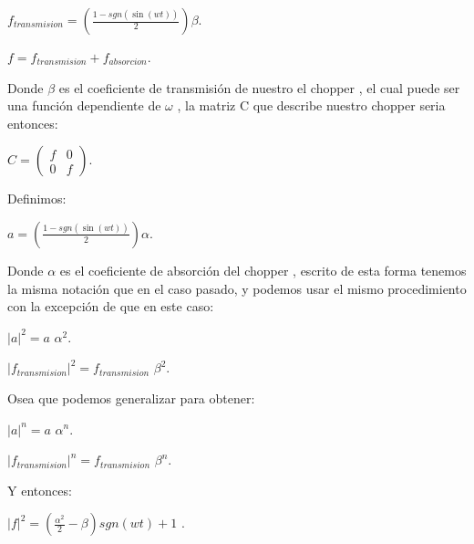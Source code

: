 \documentclass[11pt]{article}
\begin{document}
$f_{transmision}=\left(\frac{1-sgn(\sin(wt))}{2} \right)\beta$.

$f=f_{transmision}+f_{absorcion}$.

\vspace{0.4cm}

Donde $\beta$
 es el coeficiente de transmisión de nuestro el chopper
, el cual puede ser una función dependiente de $\omega$
, la matriz C que describe nuestro chopper
 seria entonces:
 
\vspace{0.4cm}

$C
=\begin
{pmatrix} f & 0 \\ 0 & f \end
{pmatrix}$.

Definimos:

$a=\left(\frac{1-sgn(\sin(wt))}{2}\right) \alpha$.

Donde $\alpha
 $ es el coeficiente de absorción del chopper
, escrito de esta forma tenemos la misma notación que en el caso pasado, y podemos usar el mismo procedimiento con la excepción de que en este caso:

$|a|^2=a$ $\alpha^2$.

$|f_{transmision}|^2=f_{transmision}$ $\beta^2$.

Osea que podemos generalizar para obtener:

$|a|^n=a$ $\alpha^n$.

$|f_{transmision}|^n=f_{transmision}$ $\beta^n$.

Y entonces:

$|f|^2= \left( \frac{\alpha^2}{2}-\beta \right)sgn(wt) +1$ .

\vspace{0.5cm}
\end{document}
